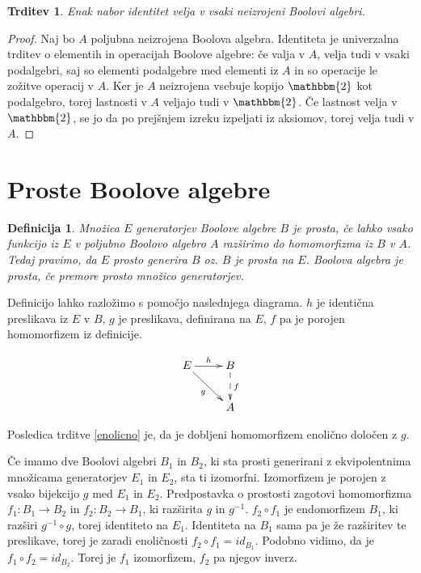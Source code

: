 \documentclass{amsart}
\newtheorem{trditev}[izrek]{Trditev}
\newtheorem{definicija}[izrek]{Definicija}
\begin{document}
\begin{trditev}
    Enak nabor identitet velja v vsaki neizrojeni Boolovi algebri.
\end{trditev}

\begin{proof}
    Naj bo $A$ poljubna neizrojena Boolova algebra.
    Identiteta je univerzalna trditev o elementih in operacijah Boolove
    algebre: če valja v $A$, velja tudi v vsaki podalgebri, saj so elementi 
    podalgebre med elementi iz $A$ in so operacije le zožitve operacij v $A$.
    Ker je $A$ neizrojena vsebuje kopijo $\mathbbm{2}$ kot podalgebro, 
    torej lastnosti v $A$ veljajo tudi v $\mathbbm{2}$. Če lastnost velja
    v  $\mathbbm{2}$, se jo da po prejšnjem izreku izpeljati iz aksiomov,
    torej velja tudi v $A$.
\end{proof}

\section{Proste Boolove algebre}

\begin{definicija}
    Množica $E$ generatorjev Boolove algebre $B$ je prosta, če lahko vsako funkcijo iz $E$ v poljubno
    Boolovo algebro $A$ razširimo do homomorfizma iz $B$ v $A$. Tedaj pravimo, da $E$ prosto generira $B$ oz.
    $B$ je prosta na $E$. Boolova algebra je prosta, če premore prosto množico generatorjev.
\end{definicija}

Definicijo lahko razložimo s pomočjo naslednjega diagrama. $h$ je identična preslikava iz $E$ v $B$,
$g$ je preslikava, definirana na $E$, $f$ pa je porojen homomorfizem
iz definicije.

\begin{equation*}
  \xymatrix{
    {E}
    \ar[r]^{h}
    \ar[dr]_{g}
    &
    {B}
    \ar@{-->}[d]^f
    \\
    &
    {A}
  }
\end{equation*}

Posledica trditve \ref{enolicno} je, da je dobljeni homomorfizem enolično
določen z $g$.

Če imamo dve Boolovi algebri $B_1$ in $B_2$, ki sta prosti generirani
z ekvipolentnima množicama generatorjev $E_1$ in $E_2$,
sta ti izomorfni. Izomorfizem 
je porojen z vsako bijekcijo $g$ med $E_1$ in $E_2$.
Predpostavka o prostosti zagotovi homomorfizma \(f_1: B_1 \to B_2\) in \(f_2: B_2 \to B_1\),
ki razširita \(g\) in \(g^{-1}\). \(f_2 \circ f_1\) je endomorfizem
$B_1$, ki razširi \(g^{-1} \circ g\), torej identiteto na $E_1$. Identiteta na $B_1$ sama
pa je že razširitev te preslikave, torej je zaradi enoličnosti
\(f_2 \circ f_1 = id_{B_1}\). Podobno vidimo, da je \(f_1 \circ f_2 = id_{B_2}\).
Torej je \(f_1\) izomorfizem, \(f_2\) pa njegov inverz.
\end{document}
